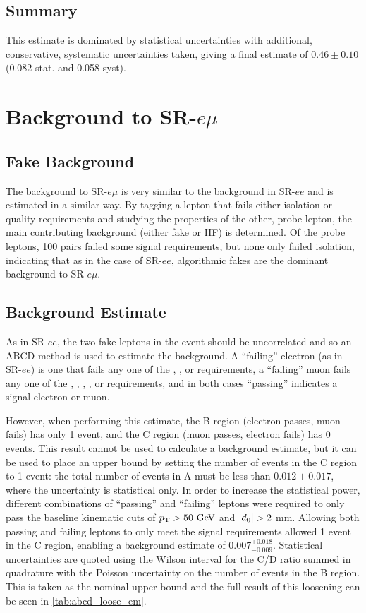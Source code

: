 \subsection{Summary}

This estimate is dominated by statistical uncertainties with additional, conservative, systematic uncertainties taken, giving a final estimate of $0.46 \pm 0.10$ (0.082 stat. and 0.058 syst).


\section{Background to SR-$e\mu$}

\subsection{Fake Background}
The background to SR-$e\mu$ is very similar to the background in SR-$ee$ and is estimated in a similar way. By tagging a lepton that fails either isolation or quality requirements and studying the properties of the other, probe lepton, the main contributing background (either fake or \ac{HF}) is determined. Of the probe leptons, 100 pairs failed some signal requirements, but none only failed isolation, indicating that as in the case of SR-$ee$, algorithmic fakes are the dominant background to SR-$e\mu$. 

\subsection{Background Estimate}
As in SR-$ee$, the two fake leptons in the event should be uncorrelated and so an ABCD method is used to estimate the background. A ``failing'' electron (as in SR-$ee$) is one that fails any one of the \dpt, \chiID, or \nmiss requirements, a ``failing'' muon fails any one of the  \chiID, \chiCB, \nmiss, \nprecision, or \nphi requirements, and in both cases ``passing'' indicates a signal electron or muon.

However, when performing this estimate, the B region (electron passes, muon fails) has only 1 event, and the C region (muon passes, electron fails) has 0 events. This result cannot be used to calculate a background estimate, but it can be used to place an upper bound by setting the number of events in the C region to 1 event: the total number of events in A must be less than $0.012 \pm 0.017$, where the uncertainty is statistical only. In order to increase the statistical power, different combinations of ``passing'' and ``failing'' leptons were required to only pass the baseline kinematic cuts of $\pt > 50 \GeV$ and $|d_0| > 2$ mm. Allowing both passing and failing leptons to only meet the signal requirements allowed 1 event in the C region, enabling a background estimate of $0.007^{+0.018}_{-0.009}$. Statistical uncertainties are quoted using the Wilson interval for the C/D ratio summed in quadrature with the Poisson uncertainty on the number of events in the B region. This is taken as the nominal upper bound and the full result of this loosening can be seen in \autoref{tab:abcd_loose_em}.

